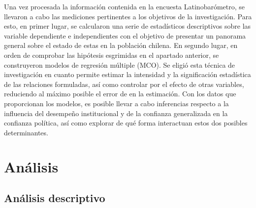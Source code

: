 \documentclass[12pt,twoside]{templates/facsothesis}
\begin{document}
Una vez procesada la información contenida en la encuesta Latinobarómetro, se llevaron a cabo las mediciones pertinentes a los objetivos de la investigación. Para esto, en primer lugar, se calcularon una serie de estadísticos descriptivos sobre las variable dependiente e independientes con el objetivo de presentar un panorama general sobre el estado de estas en la población chilena. En segundo lugar, en orden de comprobar las hipótesis esgrimidas en el apartado anterior, se construyeron modelos de regresión múltiple (MCO). Se eligió esta técnica de investigación en cuanto permite estimar la intensidad y la significación estadística de las relaciones formuladas, así como controlar por el efecto de otras variables, reduciendo al máximo posible el error de en la estimación. Con los datos que proporcionan los modelos, es posible llevar a cabo inferencias respecto a la influencia del desempeño institucional y de la confianza generalizada en la confianza política, así como explorar de qué forma interactuan estos dos posibles determinantes.

\chapter{Análisis}\label{anuxe1lisis}

\section{Análisis descriptivo}\label{anuxe1lisis-descriptivo}
\end{document}
